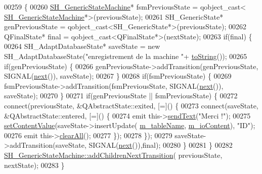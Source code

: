 \begin{DoxyCode}
00259 \{
00260     \hyperlink{classSimpleHotel_1_1SH__GenericStateMachine_a0943c733abdbe70ea78f9e1f90a26154}{SH\_GenericStateMachine}* fsmPreviousState = qobject\_cast<
      \hyperlink{classSimpleHotel_1_1SH__GenericStateMachine_a0943c733abdbe70ea78f9e1f90a26154}{SH\_GenericStateMachine}*>(previousState);
00261     SH\_GenericState* genPreviousState = qobject\_cast<SH\_GenericState*>(previousState);
00262     QFinalState* \textcolor{keyword}{final} = qobject\_cast<QFinalState*>(nextState);
00263     \textcolor{keywordflow}{if}(\textcolor{keyword}{final}) \{
00264         SH\_AdaptDatabaseState* saveState = \textcolor{keyword}{new} SH\_AdaptDatabaseState(\textcolor{stringliteral}{"enregistrement de la machine "}+
      \hyperlink{classSimpleHotel_1_1SH__GenericStateMachine_ad6dd1d0986c40684410ed94f1f610b12}{toString}());
00265         \textcolor{keywordflow}{if}(genPreviousState) \{
00266             genPreviousState->addTransition(genPreviousState, SIGNAL(\hyperlink{classSimpleHotel_1_1SH__GenericStateMachine_a2de14d4920ae8c10b70c2d73fc2d4a93}{next}()), saveState);
00267         \}
00268         \textcolor{keywordflow}{if}(fsmPreviousState) \{
00269             fsmPreviousState->addTransition(fsmPreviousState, SIGNAL(\hyperlink{classSimpleHotel_1_1SH__GenericStateMachine_a2de14d4920ae8c10b70c2d73fc2d4a93}{next}()), saveState);
00270         \}
00271         \textcolor{keywordflow}{if}(genPreviousState || fsmPreviousState) \{
00272             connect(previousState, &QAbstractState::exited, [=]() \{
00273                 connect(saveState, &QAbstractState::entered, [=]() \{
00274                     emit this->\hyperlink{classSimpleHotel_1_1SH__InOutStateMachine_ae81d4a51fcd3277ebfc11af978b74c0b}{sendText}(\textcolor{stringliteral}{"Merci !"});
00275                     \hyperlink{classSimpleHotel_1_1SH__InOutStateMachine_aaf92da452f6cf7cc57aa9e60f88322e4}{setContentValue}(saveState->insertUpdate(
      \hyperlink{classSimpleHotel_1_1SH__InOutStateMachine_a15c063debdaa4c87bd4925867a13ce9e}{m\_tableName}, \hyperlink{classSimpleHotel_1_1SH__InOutStateMachine_a4b0a3a48b0da31fddb724a357ad9b52c}{m\_ioContent}), \textcolor{stringliteral}{"ID"});
00276                     emit this->\hyperlink{classSimpleHotel_1_1SH__InOutStateMachine_a2b6d60f624ba23c8fc3e52f73e867c86}{clearAll}();
00277                 \});
00278             \});
00279             saveState->addTransition(saveState, SIGNAL(\hyperlink{classSimpleHotel_1_1SH__GenericStateMachine_a2de14d4920ae8c10b70c2d73fc2d4a93}{next}()),\textcolor{keyword}{final});
00280         \}
00281     \}
00282     \hyperlink{classSimpleHotel_1_1SH__GenericStateMachine_a3771c91002bec6ab9414703251cc7825}{SH\_GenericStateMachine::addChildrenNextTransition}(
      previousState, nextState);
00283 \}
\end{DoxyCode}
